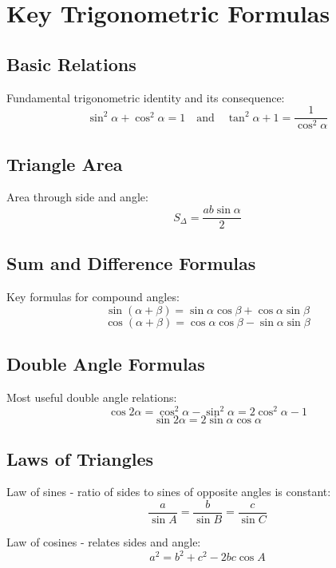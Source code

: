 \documentclass{article}
\begin{document}
\section*{Key Trigonometric Formulas}

\subsection*{Basic Relations}
Fundamental trigonometric identity and its consequence:
\[
\sin^2\alpha + \cos^2\alpha = 1 \quad\text{and}\quad \tan^2\alpha + 1 = \frac{1}{\cos^2\alpha}
\]

\subsection*{Triangle Area}
Area through side and angle:
\[
S_\Delta = \frac{ab\sin\alpha}{2}
\]

\subsection*{Sum and Difference Formulas}
Key formulas for compound angles:
\[
\sin(\alpha + \beta) = \sin\alpha\cos\beta + \cos\alpha\sin\beta
\]
\[
\cos(\alpha + \beta) = \cos\alpha\cos\beta - \sin\alpha\sin\beta
\]

\subsection*{Double Angle Formulas}
Most useful double angle relations:
\[
\cos2\alpha = \cos^2\alpha - \sin^2\alpha = 2\cos^2\alpha - 1
\]
\[
\sin2\alpha = 2\sin\alpha\cos\alpha
\]

\subsection*{Laws of Triangles}
Law of sines - ratio of sides to sines of opposite angles is constant:
\[
\frac{a}{\sin A} = \frac{b}{\sin B} = \frac{c}{\sin C}
\]

Law of cosines - relates sides and angle:
\[
a^2 = b^2 + c^2 - 2bc\cos A
\]
\end{document}
